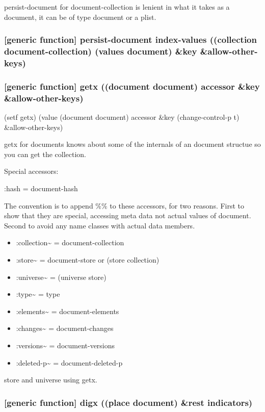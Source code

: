 \documentclass[11pt]{article}
\begin{document}
persist-document for document-collection is lenient in what it takes
as a document, it can be of type document or a plist.

\subsubsection{[generic function] persist-document index-values ((collection document-collection) (values document) \&key \&allow-other-keys)}
\label{sec:org0a72ada}

\subsubsection{[generic function] getx ((document document) accessor \&key \&allow-other-keys)}
\label{sec:orgf75338a}

(setf getx) (value (document document) accessor  \&key (change-control-p t) \&allow-other-keys)

getx for documents knows about some of the internals of an document
structue so you can get the collection.

Special accessors:

:hash = document-hash

The convention is to append \%\% to these accessors, for two
reasons. First to show that they are special, accessing meta data not
actual values of document. Second to avoid any name classes with
actual data members.

\begin{itemize}
\item :collection\textasciitilde{} = document-collection
\item :store\textasciitilde{} = document-store or (store collection)
\item :universe\textasciitilde{} = (universe store)
\item :type\textasciitilde{} = type
\item :elements\textasciitilde{} = document-elements
\item :changes\textasciitilde{} = document-changes
\item :versions\textasciitilde{} = document-versions
\item :deleted-p\textasciitilde{} = document-deleted-p
\end{itemize}

store and universe using getx.

\subsubsection{[generic function] digx ((place document) \&rest indicators)}
\label{sec:org8d228dc}
\end{document}
